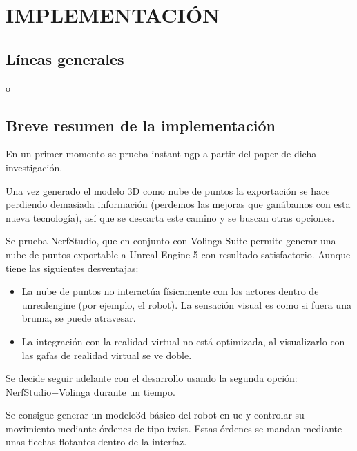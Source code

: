 \documentclass[a4paper, 12pt, spanish, twoside]{article}
\begin{document}
\clearpage





\newpage
\section{IMPLEMENTACIÓN} \label{sec:implementacion}

\subsection{Líneas generales} 

o

\subsection{Breve resumen de la implementación} 

En un primer momento se prueba \gls{instant-ngp} a partir del paper de dicha investigación. 

Una vez generado el modelo 3D como nube de puntos la exportación se hace perdiendo demasiada información (perdemos las mejoras que ganábamos con esta nueva tecnología), así que se descarta este camino y se buscan otras opciones. 

Se prueba NerfStudio, que en conjunto con Volinga Suite permite generar una nube de puntos exportable a Unreal Engine 5 con resultado satisfactorio. Aunque tiene las siguientes desventajas: 

\begin{itemize} 
\item La nube de puntos no interactúa físicamente con los \gls{actores} dentro de \gls{unrealengine} (por ejemplo, el robot). La sensación visual es como si fuera una bruma, se puede atravesar. 

\item La integración con la realidad virtual no está optimizada, al visualizarlo con las gafas de realidad virtual se ve doble. 
\end{itemize} 

Se decide seguir adelante con el desarrollo usando la segunda opción: NerfStudio+Volinga durante un tiempo. 

Se consigue generar un \gls{modelo3d} básico del robot en \acrshort{ue} y controlar su movimiento mediante órdenes de tipo \gls{twist}. Estas órdenes se mandan mediante unas flechas flotantes dentro de la interfaz. 
\end{document}
